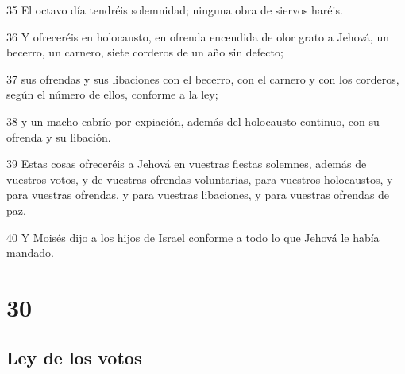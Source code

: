 \par 35 El octavo día tendréis solemnidad; ninguna obra de siervos haréis.
\par 36 Y ofreceréis en holocausto, en ofrenda encendida de olor grato a Jehová, un becerro, un carnero, siete corderos de un año sin defecto;
\par 37 sus ofrendas y sus libaciones con el becerro, con el carnero y con los corderos, según el número de ellos, conforme a la ley;
\par 38 y un macho cabrío por expiación, además del holocausto continuo, con su ofrenda y su libación.
\par 39 Estas cosas ofreceréis a Jehová en vuestras fiestas solemnes, además de vuestros votos, y de vuestras ofrendas voluntarias, para vuestros holocaustos, y para vuestras ofrendas, y para vuestras libaciones, y para vuestras ofrendas de paz.
\par 40 Y Moisés dijo a los hijos de Israel conforme a todo lo que Jehová le había mandado.

\chapter{30}

\section*{Ley de los votos}

